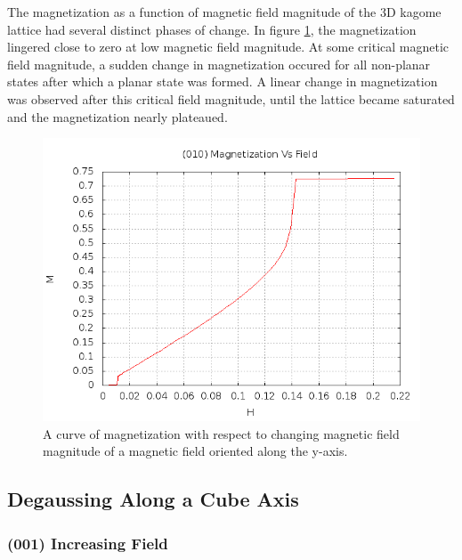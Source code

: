 The magnetization as a function of magnetic field magnitude of the 3D kagome lattice had several distinct phases of change. In figure \ref{fig:magphase}, the magnetization lingered close to zero at low magnetic field magnitude. At some critical magnetic field magnitude, a sudden change in magnetization occured for all non-planar states after which a planar state was formed. A linear change in magnetization was observed after this critical field magnitude, until the lattice became saturated and the magnetization nearly plateaued. 

\begin{figure}
\includegraphics[scale=0.7]{img/magneticphases.png}
\caption{A curve of magnetization with respect to changing magnetic field magnitude of a magnetic field oriented along the y-axis.}
\label{fig:magphase}
\end{figure}

\subsection{Degaussing Along a Cube Axis}

\subsubsection{(001) Increasing Field}
